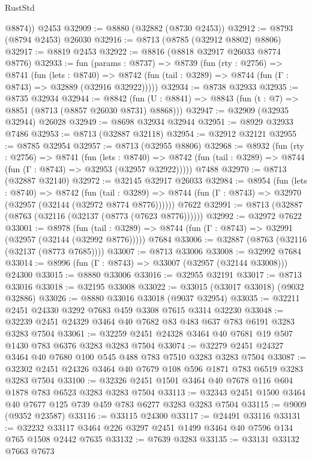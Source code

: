 \begin{lexlean}{RustStd}
\begin{coremodule}
        @8874))
    @2453
@32909 := @8880 (@32882 (@8730 @2453))
@32912 := @8793 (@8794 @2453) @26030
@32916 := @8713 (@8785 (@32912 @8802) @8806)
@32917 := @8819 @2453
@32922 := @8816 (@8818 @32917 @26033 @8774 @8776)
@32933 := fun (params : @8737) =>
  @8739
    (fun (rty : @2756) =>
    @8741
      (fun (lets : @8740) =>
      @8742 (fun (tail : @3289) => @8744 (fun (Γ : @8743) => @32889 (@32916 @32922)))))
@32934 := @8738 @32933
@32935 := @8735 @32934
@32944 := @8842
    (fun (U : @8841) => @8843 (fun (t : @7) => @8851 (@8713 (@8857 @26030 @8731) @8868)))
@32947 := @32909 (@32935 @32944) @26028
@32949 := @8698 @32934 @32944
@32951 := @8929 @32933 @7486
@32953 := @8713 (@32887 @32118)
@32954 := @32912 @32121
@32955 := @8785 @32954
@32957 := @8713 (@32955 @8806)
@32968 := @8932
    (fun (rty : @2756) =>
    @8741
      (fun (lets : @8740) =>
      @8742 (fun (tail : @3289) => @8744 (fun (Γ : @8743) => @32953 (@32957 @32922)))))
    @7488
@32970 := @8713 (@32887 @32140)
@32972 := @32145 @32917 @26033
@32984 := @8954
    (fun (lets : @8740) =>
    @8742
      (fun (tail : @3289) =>
      @8744 (fun (Γ : @8743) => @32970 (@32957 (@32144 (@32972 @8774 @8776))))))
    @7622
@32991 := @8713 (@32887 (@8763 (@32116 (@32137 (@8773 (@7623 @8776))))))
@32992 := @32972 @7622
@33001 := @8978
    (fun (tail : @3289) => @8744 (fun (Γ : @8743) => @32991 (@32957 (@32144 (@32992 @8776)))))
    @7684
@33006 := @32887 (@8763 (@32116 (@32137 (@8773 @7685))))
@33007 := @8713 @33006
@33008 := @32992 @7684
@33014 := @8996 (fun (Γ : @8743) => @33007 (@32957 (@32144 @33008))) @24300
@33015 := @8880 @33006
@33016 := @32955 @32191
@33017 := @8713 @33016
@33018 := @32195 @33008
@33022 := @33015 (@33017 @33018) (@9032 @32886)
@33026 := @8880 @33016 @33018 (@9037 @32954)
@33035 := @32211 @2451 @24330 @3292 @7683 @459 @3308 @7615 @3314 @32230
@33048 := @32239 @2451 @24329 @3464 @40 @7682 @83 @483 @637 @783 @6191 @3283 @3283 @7504
@33061 := @32259 @2451 @24328 @3464 @40 @7681 @19 @507 @1430 @783 @6376 @3283 @3283 @7504
@33074 := @32279 @2451 @24327 @3464 @40 @7680 @100 @545 @488 @783 @7510 @3283 @3283 @7504
@33087 := @32302 @2451 @24326 @3464 @40 @7679 @108 @596 @1871 @783 @6519 @3283 @3283 @7504
@33100 := @32326 @2451 @1501 @3464 @40 @7678 @116 @604 @1878 @783 @6523 @3283 @3283 @7504
@33113 := @32343 @2451 @1500 @3464 @40 @7677 @125 @739 @459 @783 @6277 @3283 @3283 @7504
@33115 := @9009 (@9352 @23587)
@33116 := @33115 @24300
@33117 := @24491 @33116
@33131 := @32232 @33117 @3464 @226 @3297 @2451 @1499 @3464 @40 @7596 @134 @765 @1508 @2442 @7635
@33132 := @7639 @3283
@33135 := @33131 @33132 @7663 @7673

\end{coremodule}
\end{lexlean}
